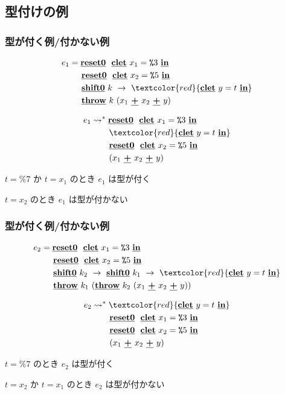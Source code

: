 \documentclass[dvipdfmx,cjk,xcolor=dvipsnames,envcountsect,notheorems,12pt]{beamer}
\newcommand\cResetz{\underline{\textbf{reset0}}}
\newcommand\cShiftz{\underline{\textbf{shift0}}}
\newcommand\cThrow{\underline{\textbf{throw}}}
\newcommand\cPlus{\underline{\textbf{+}}}
\newcommand\cLet{\underline{\textbf{clet}}}
\newcommand\cIn{\underline{\textbf{in}}}
\newcommand\csp[1]{\texttt{\%}{#1}}
\newcommand\too{\leadsto^*}
\newcommand\red[1]{\textcolor{red}{#1}}
\theoremstyle{definition}
\begin{document}
\subsection{型付けの例}
\begin{frame}
  \frametitle{型が付く例/付かない例}
  \begin{align*}
    e_1 & = \cResetz ~~\cLet~x_1=\csp{3}~\cIn \\
        & \phantom{=}~~ \cResetz ~~\cLet~x_2=\csp{5}~\cIn \\
        & \phantom{=}~~ \cShiftz~k~\to~ \red{\cLet~y=t~\cIn} \\
        & \phantom{=}~~ \cThrow~k~(x_1~\cPlus~x_2~\cPlus~y)
  \end{align*}

  \pause

  \begin{align*}
    e_1 & \too \cResetz ~~\cLet~x_1=\csp{3}~\cIn \\
        & \phantom{\too}~~ \red{\cLet~y=t~\cIn} \\
        & \phantom{\too}~~ \cResetz ~~\cLet~x_2=\csp{5}~\cIn \\
        & \phantom{\too}~~ (x_1~\cPlus~x_2~\cPlus~y)
  \end{align*}

  \pause
  $t=\csp{7}$ か $t=x_1$ のとき $e_1$ は型が付く

  $t=x_2$ のとき $e_1$ は型が付かない

\end{frame}

\begin{frame}
  \frametitle{型が付く例/付かない例}
  \begin{align*}
    e_2 & = \cResetz ~~\cLet~x_1=\csp{3}~\cIn \\
        & \phantom{=}~~ \cResetz ~~\cLet~x_2=\csp{5}~\cIn \\
        & \phantom{=}~~ \cShiftz~k_2~\to~ \cShiftz~k_1~\to~ \red{\cLet~y=t~\cIn} \\
        & \phantom{=}~~ \cThrow~k_1~(\cThrow~k_2~(x_1~\cPlus~x_2~\cPlus~y))
  \end{align*}

  \pause

  \begin{align*}
    e_2 & \too \red{\cLet~y=t~\cIn} \\
        & \phantom{\too}~~ \cResetz ~~\cLet~x_1=\csp{3}~\cIn \\
        & \phantom{\too}~~ \cResetz ~~\cLet~x_2=\csp{5}~\cIn \\
        & \phantom{\too}~~ (x_1~\cPlus~x_2~\cPlus~y)
  \end{align*}

  \pause
  $t=\csp{7}$ のとき $e_2$ は型が付く

  $t=x_2$ か $t=x_1$ のとき $e_2$ は型が付かない
\end{frame}
\end{document}
